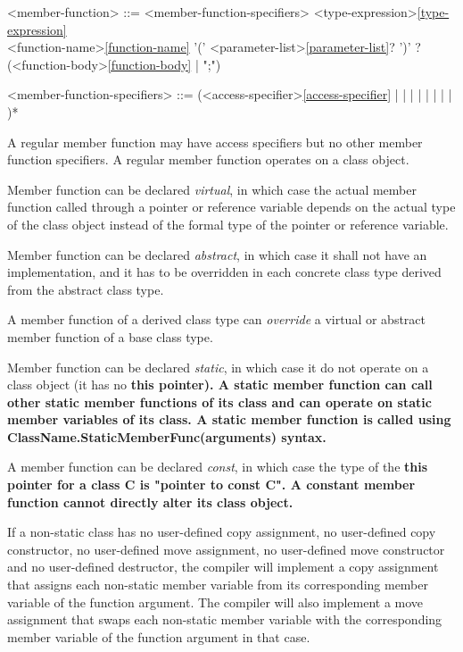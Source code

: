\documentclass[a4paper,oneside,11pt]{article}
\begin{document}
\begin{grammar}
\label{member-function}<member-function> ::= <member-function-specifiers> <type-expression>\ref{type-expression}\\
<function-name>\ref{function-name} '(' <parameter-list>\ref{parameter-list}? ')' ?
(<function-body>\ref{function-body} | ";")

<member-function-specifiers> ::= (<access-specifier>\ref{access-specifier}
\alt {} |  |  |  |  |  |  |  | )*
\end{grammar}

A regular member function may have access specifiers but no other member function specifiers.
A regular member function operates on a class object.

Member function can be declared \emph{virtual}, in which case the actual member function called
through a pointer or reference variable depends on the actual type of the class object
instead of the formal type of the pointer or reference variable.

Member function can be declared \emph{abstract}, in which case it shall not have an implementation,
and it has to be overridden in each concrete class type derived from the abstract class type.

A member function of a derived class type can \emph{override} a virtual or abstract member function
of a base class type.

Member function can be declared \emph{static}, in which case it do not operate on a class object
(it has no \bf{this} pointer).
A static member function can call other static member functions of its class and can operate on
static member variables of its class.
A static member function is called using ClassName.StaticMemberFunc(arguments) syntax.

A member function can be declared \emph{const}, in which case the type of the \bf{this} pointer
for a class C is "pointer to \bf{const} C".
A constant member function cannot directly alter its class object.

If a non-static class has no user-defined copy assignment, no user-defined copy constructor,
no user-defined move assignment, no user-defined move constructor and no user-defined destructor,
the compiler will implement a copy assignment that assigns each non-static member variable
from its corresponding member variable of the function argument.
The compiler will also implement a move assignment that swaps each non-static member variable
with the corresponding member variable of the function argument in that case.
\end{document}

